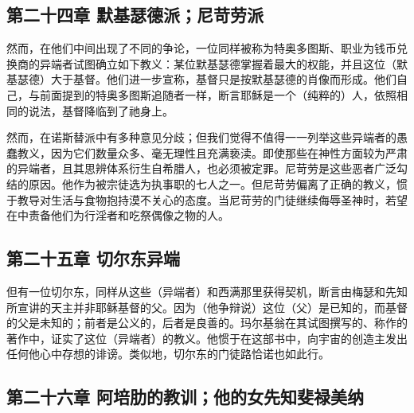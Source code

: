 
\subsection{第二十四章 默基瑟德派；尼苛劳派}

然而，在他们中间出现了不同的争论，一位同样被称为特奥多图斯、职业为钱币兑换商的异端者试图确立如下教义：某位默基瑟德掌握着最大的权能，并且这位（默基瑟德）大于基督。他们进一步宣称，基督只是按默基瑟德的肖像而形成。他们自己，与前面提到的特奥多图斯追随者一样，断言耶稣是一个（纯粹的）人，依照相同的说法，基督降临到了祂身上。\par

然而，在诺斯替派中有多种意见分歧；但我们觉得不值得一一列举这些异端者的愚蠢教义，因为它们数量众多、毫无理性且充满亵渎。即使那些在神性方面较为严肃的异端者，且其思辨体系衍生自希腊人，也必须被定罪。尼苛劳是这些恶者广泛勾结的原因。他作为被宗徒选为执事职的七人之一。但尼苛劳偏离了正确的教义，惯于教导对生活与食物抱持漠不关心的态度。当尼苛劳的门徒继续侮辱圣神时，若望在中责备他们为行淫者和吃祭偶像之物的人。\par


\subsection{第二十五章 切尔东异端}

但有一位切尔东，同样从这些（异端者）和西满那里获得契机，断言由梅瑟和先知所宣讲的天主并非耶稣基督的父。因为（他争辩说）这位（父）是已知的，而基督的父是未知的；前者是公义的，后者是良善的。玛尔基翁在其试图撰写的、称作的著作中，证实了这位（异端者）的教义。他惯于在这部书中，向宇宙的创造主发出任何他心中存想的诽谤。类似地，切尔东的门徒路恰诺也如此行。\par


\subsection{第二十六章 阿培肋的教训；他的女先知斐禄美纳}

